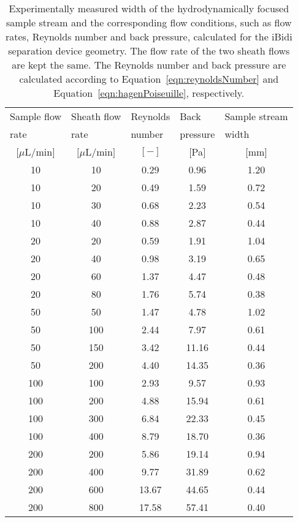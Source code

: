 \begin{table}[htb]
\begin{center}
\caption[Sample stream width and flow conditions used in the hydrodynamic focusing experiment]{Experimentally measured width of the hydrodynamically focused sample stream and the corresponding flow conditions, such as flow rates, Reynolds number and back pressure, calculated for the iBidi separation device geometry. The flow rate of the two sheath flows are kept the same. The Reynolds number and back pressure are calculated according to Equation~\ref{eqn:reynoldsNumber} and Equation~\ref{eqn:hagenPoiseuille}, respectively.}
\vspace{1ex}
\label{tab:hydrodynamicFocusingFlowConditionSampleStreamWidth}
\begin{tabular}{ccccc}\hline
\multicolumn{1}{l}{Sample flow} & \multicolumn{1}{l}{Sheath flow} &  \multicolumn{1}{l}{Reynolds} & \multicolumn{1}{l}{Back} & \multicolumn{1}{l}{Sample stream} \\ 
\multicolumn{1}{l}{rate} & \multicolumn{1}{l}{rate} &  \multicolumn{1}{l}{number} & \multicolumn{1}{l}{pressure} & \multicolumn{1}{l}{width} \\ 
$[\mu$L/min$]$ 		& $[\mu$L/min$]$  	&	$[-]$	& $[$Pa$]$  & $[$mm$]$\\
\hline
10 		& 10 			& 0.29 & 0.96 & 1.20 \\
10 		& 20 		& 0.49 & 1.59 & 0.72 \\
10 		& 30 		& 0.68 & 2.23 & 0.54 \\
10 		& 40 		& 0.88 & 2.87 & 0.44 \\
20 		& 20 		& 0.59 & 1.91 & 1.04 \\
20 		& 40 		& 0.98 & 3.19 & 0.65\\
20 		& 60 		& 1.37 & 4.47 & 0.48 \\
20 		& 80			& 1.76 & 5.74 & 0.38 \\
50 		& 50 		& 1.47 & 4.78 & 1.02 \\
50 		& 100 		& 2.44 & 7.97 & 0.61 \\
50 		& 150 		& 3.42 & 11.16 & 0.44 \\
50 		& 200 		& 4.40 & 14.35 & 0.36 \\
100 		& 100 		& 2.93 & 9.57 & 0.93 \\
100 		& 200 		& 4.88 & 15.94 & 0.61 \\
100 		& 300 		& 6.84 & 22.33 & 0.45 \\
100 		& 400 		& 8.79 & 18.70 & 0.36 \\
200 		& 200 		& 5.86 & 19.14 & 0.94 \\
200 		& 400 		& 9.77 & 31.89 & 0.62 \\
200 		& 600 		& 13.67 & 44.65 & 0.44 \\
200 		& 800 		& 17.58 & 57.41 & 0.40\\ 
\hline
\end{tabular}
\end{center}
\end{table}

